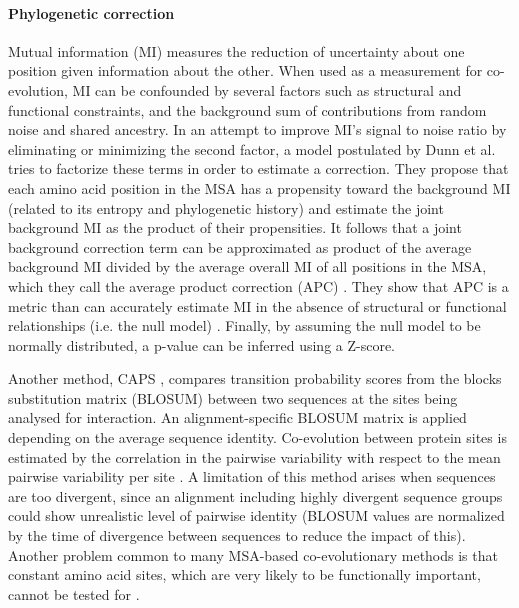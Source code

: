 \paragraph{Phylogenetic correction}
Mutual information (MI) measures the reduction of uncertainty about one position given information about the other.
When used as a measurement for co-evolution, MI can be confounded by several factors such as structural and functional constraints, and the background sum of contributions from random noise and shared ancestry.
In an attempt to improve MI's signal to noise ratio by eliminating or minimizing the second factor, a model postulated by Dunn et al. \cite{dunn2008mutual} tries to factorize these terms in order to estimate a correction.
They propose that each amino acid position in the MSA has a propensity toward the background MI (related to its entropy and phylogenetic history) and estimate the joint background MI as the product of their propensities.
It follows that a joint background correction term can be approximated as product of the average background MI divided by the average overall MI of all positions in the MSA, which they call the average product correction (APC) \cite{dunn2008mutual}.
They show that APC is a metric than can accurately estimate MI in the absence of structural or functional relationships (i.e. the null model) \cite{dunn2008mutual}.
Finally, by assuming the null model to be normally distributed, a p-value can be inferred using a Z-score.

Another method, CAPS \cite{fares2006novel}, compares transition probability scores from the blocks substitution matrix (BLOSUM) between two sequences at the sites being analysed for interaction.
An alignment-specific BLOSUM matrix is applied depending on the average sequence identity.
Co-evolution between protein sites is estimated by the correlation in the pairwise variability with respect to the mean pairwise variability per site \cite{fares2006novel}.
A limitation of this method arises when sequences are too divergent, since an alignment including highly divergent sequence groups could show unrealistic level of pairwise identity (BLOSUM values are normalized by the time of divergence between sequences to reduce the impact of this).
Another problem common to many MSA-based co-evolutionary methods is that constant amino acid sites, which are very likely to be functionally important, cannot be tested for  \cite{fares2006novel}.

